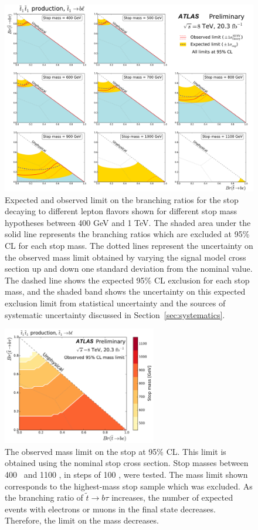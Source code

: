 \begin{figure}[ht]
  \centering
  \includegraphics[width=\textwidth]{figs/blstop/limit_contours.pdf}
  \caption{Expected and observed limit on the branching ratios for the stop
    decaying to different lepton flavors shown for different stop mass
    hypotheses between 400 GeV and 1 TeV. The shaded area under the solid
    line represents the branching ratios which are excluded at 95\% CL
    for each stop mass.
    The dotted lines represent the uncertainty on the observed mass limit
    obtained by varying the signal model cross section up and down one standard
    deviation from the nominal value. The dashed line shows the
    expected 95\% CL exclusion for each stop mass, and the shaded band shows
    the uncertainty on this expected exclusion limit from statistical
    uncertainty and the sources of systematic uncertainty discussed in
    Section~\ref{sec:systematics}.
  }
  \label{fig:limit_contours}
\end{figure}

\begin{figure}[ht]
  \centering
  \includegraphics[width=0.6\textwidth]{figs/blstop/mass_limit_contours_no_extras_obs.pdf}
  \caption{The observed mass limit on the stop at 95\% CL.
    This limit is obtained using the nominal stop cross section.
    Stop masses between 400 \GeV\ and 1100 \GeV, in steps of 100 \GeV, were
    tested. The mass limit shown corresponds to the highest-mass stop sample
    which was excluded.
    As the branching ratio of $\tilde{t} \rightarrow b\tau$ increases, the
    number of expected events with electrons or muons in the final state
    decreases. Therefore, the limit on the mass decreases.
  }
  \label{fig:mass_limit_obs}
\end{figure}

